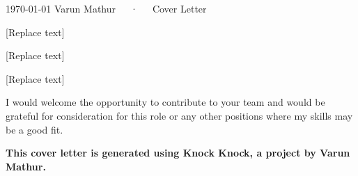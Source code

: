 \documentclass[11pt, a4paper]{awesome-cv}
\begin{document}
\makecvheader[C]

\makecvfooter
{\today}
{Varun Mathur~~~·~~~Cover Letter}
{}

\makelettertitle

\begin{cvletter}

[Replace text]

[Replace text]

[Replace text]

I would welcome the opportunity to contribute to your team and would be grateful for consideration for this role or any other positions where my skills may be a good fit.

\textbf{This cover letter is generated using Knock Knock, a project by Varun Mathur.}

\end{cvletter}


\makeletterclosing
\end{document}
